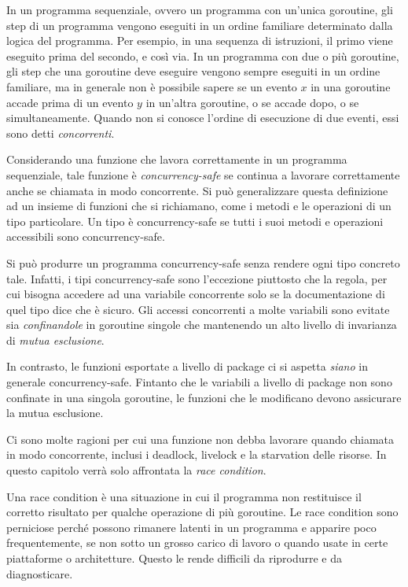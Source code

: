 %
In un programma sequenziale, ovvero un programma con un'unica goroutine, gli step di un programma vengono eseguiti in un ordine familiare determinato dalla logica del programma.
Per esempio, in una sequenza di istruzioni, il primo viene eseguito prima del secondo, e così via.
In un programma con due o più goroutine, gli step che una goroutine deve eseguire vengono sempre eseguiti in un ordine familiare, ma in generale non è possibile sapere se un evento $x$ in una goroutine accade prima di un evento $y$ in un'altra goroutine, o se accade dopo, o se simultaneamente.
Quando non si conosce l'ordine di esecuzione di due eventi, essi sono detti \textit{concorrenti}.

Considerando una funzione che lavora correttamente in un programma sequenziale, tale funzione è \textit{concurrency-safe} se continua a lavorare correttamente anche se chiamata in modo concorrente.
Si può generalizzare questa definizione ad un insieme di funzioni che si richiamano, come i metodi e le operazioni di un tipo particolare.
Un tipo è concurrency-safe se tutti i suoi metodi e operazioni accessibili sono concurrency-safe.

Si può produrre un programma concurrency-safe senza rendere ogni tipo concreto tale.
Infatti, i tipi concurrency-safe sono l'eccezione piuttosto che la regola, per cui bisogna accedere ad una variabile concorrente solo se la documentazione di quel tipo dice che è sicuro.
Gli accessi concorrenti a molte variabili sono evitate sia \textit{confinandole} in goroutine singole che mantenendo un alto livello di invarianza di \textit{mutua esclusione}.

In contrasto, le funzioni esportate a livello di package ci si aspetta \textit{siano} in generale concurrency-safe.
Fintanto che le variabili a livello di package non sono confinate in una singola goroutine, le funzioni che le modificano devono assicurare la mutua esclusione.

Ci sono molte ragioni per cui una funzione non debba lavorare quando chiamata in modo concorrente, inclusi i deadlock, livelock e la starvation delle risorse.
In questo capitolo verrà solo affrontata la \textit{race condition}.

Una race condition è una situazione in cui il programma non restituisce il corretto risultato per qualche operazione di più goroutine.
Le race condition sono perniciose perché possono rimanere latenti in un programma e apparire poco frequentemente, se non sotto un grosso carico di lavoro o quando usate in certe piattaforme o architetture.
Questo le rende difficili da riprodurre e da diagnosticare.

